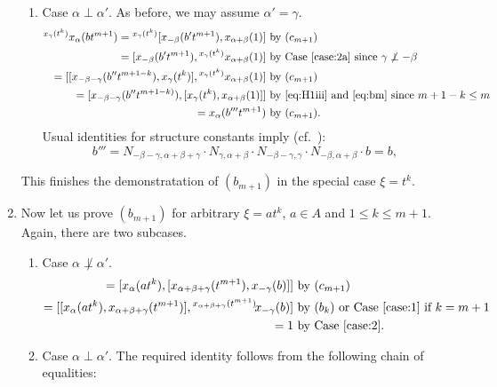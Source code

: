 \documentclass[oneside, 10pt]{amsart}
\theoremstyle{remark}
\begin{document}
\begin{enumerate}
\begin{enumerate}
 \item Case $\alpha\perp\alpha'$. As before, we may assume $\alpha'=\gamma$.
\begin{align*}
{}^{x_\gamma(t^k)}x_\alpha(bt^{m+1}) = {}^{x_\gamma(t^k)}[x_{-\beta}(b't^{m+1}), x_{\alpha+\beta}(1)] & \text{ by $(c_{m+1})$}\\
 = [x_{-\beta}(b't^{m+1}), {}^{x_\gamma(t^k)}x_{\alpha+\beta}(1)]                                     & \text{ by Case~\eqref{case:2a} since $\gamma\not\perp-\beta$}\\
 = [[x_{-\beta-\gamma}(b''t^{m+1-k}), x_\gamma(t^k)], {}^{x_\gamma(t^k)}x_{\alpha+\beta}(1)]          & \text{ by $(c_{m+1})$}\\
 = [x_{-\beta-\gamma}(b''t^{m+1-k)}), [x_\gamma(t^k), x_{\alpha+\beta}(1)]]                           & \text{ by~\eqref{eq:H1iii} and~\eqref{eq:bm} since $m+1-k \leq m$}\\
 = x_{\alpha}(b'''t^{m+1})                                                                            & \text{ by $(c_{m+1})$.} \end{align*}
 Usual identities for structure constants imply (cf.~\cite[p.~12]{R75}):
 \[b'''=N_{-\beta-\gamma, \alpha+\beta+\gamma} \cdot N_{\gamma, \alpha+\beta} \cdot N_{-\beta-\gamma, \gamma} \cdot N_{-\beta, \alpha+\beta} \cdot b = b, \] 
\end{enumerate}
This finishes the demonstratation of $(b_{m+1})$ in the special case $\xi=t^k$.
\item Now let us prove $(b_{m+1})$ for arbitrary $\xi = at^k$, $a\in A$ and $1\leq k\leq m+1$. Again, there are two subcases.
\begin{enumerate}
\item \label{case:3a} Case $\alpha \not\perp \alpha'$. %
 \begin{align*} [x_\alpha(at^k), x_{\alpha + \beta}(bt^{m+1})] = [x_\alpha(at^k), [x_{\alpha+\beta+\gamma}(t^{m+1}), x_{-\gamma}(b)]] & \text{ by $(c_{m+1})$} \\
  = [[x_\alpha(at^k), x_{\alpha+\beta+\gamma}(t^{m+1})], {}^{x_{\alpha+\beta+\gamma}(t^{m+1})}\!x_{-\gamma}(b)] & \text{ by $(b_k)$ or Case~\eqref{case:1} if $k=m+1$} \\
  = 1 & \text{ by Case~\eqref{case:2}.} \end{align*}
\item Case $\alpha \perp \alpha'$.
The required identity follows from the following chain of equalities:

\end{enumerate}
\end{enumerate}
\end{document}
